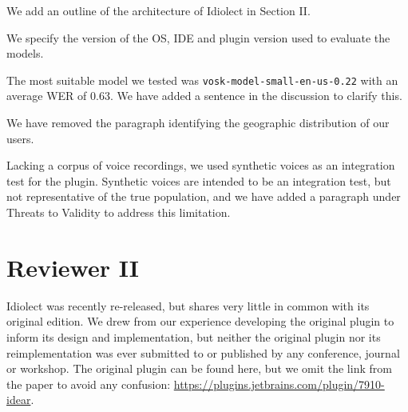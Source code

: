 \documentclass[journal,12pt,onecolumn,draftclsnofoot,]{IEEEtran}
\begin{document}
%
%
%

We add an outline of the architecture of Idiolect in Section II.

We specify the version of the OS, IDE and plugin version used to evaluate the models.

The most suitable model we tested was \texttt{vosk-model-small-en-us-0.22} with an average WER of 0.63. We have added a sentence in the discussion to clarify this.

We have removed the paragraph identifying the geographic distribution of our users.

Lacking a corpus of voice recordings, we used synthetic voices as an integration test for the plugin. Synthetic voices are intended to be an integration test, but not representative of the true population, and we have added a paragraph under Threats to Validity to address this limitation.

\section{Reviewer II}

Idiolect was recently re-released, but shares very little in common with its original edition. We drew from our experience developing the original plugin to inform its design and implementation, but neither the original plugin nor its reimplementation was ever submitted to or published by any conference, journal or workshop. The original plugin can be found here, but we omit the link from the paper to avoid any confusion: \url{https://plugins.jetbrains.com/plugin/7910-idear}.
\end{document}
